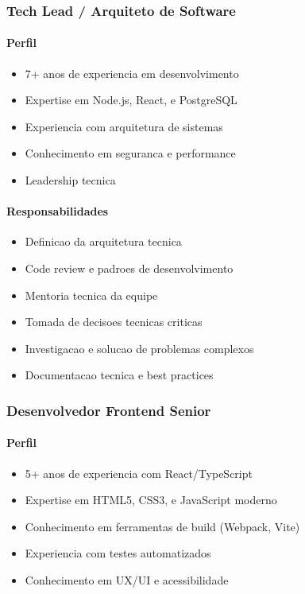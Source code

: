 \subsubsection{Tech Lead / Arquiteto de Software}
\paragraph{Perfil}
\begin{itemize}
    \item 7+ anos de experiencia em desenvolvimento
    \item Expertise em Node.js, React, e PostgreSQL
    \item Experiencia com arquitetura de sistemas
    \item Conhecimento em seguranca e performance
    \item Leadership tecnica
\end{itemize}

\paragraph{Responsabilidades}
\begin{itemize}
    \item Definicao da arquitetura tecnica
    \item Code review e padroes de desenvolvimento
    \item Mentoria tecnica da equipe
    \item Tomada de decisoes tecnicas criticas
    \item Investigacao e solucao de problemas complexos
    \item Documentacao tecnica e best practices
\end{itemize}

\subsubsection{Desenvolvedor Frontend Senior}
\paragraph{Perfil}
\begin{itemize}
    \item 5+ anos de experiencia com React/TypeScript
    \item Expertise em HTML5, CSS3, e JavaScript moderno
    \item Conhecimento em ferramentas de build (Webpack, Vite)
    \item Experiencia com testes automatizados
    \item Conhecimento em UX/UI e acessibilidade
\end{itemize}

